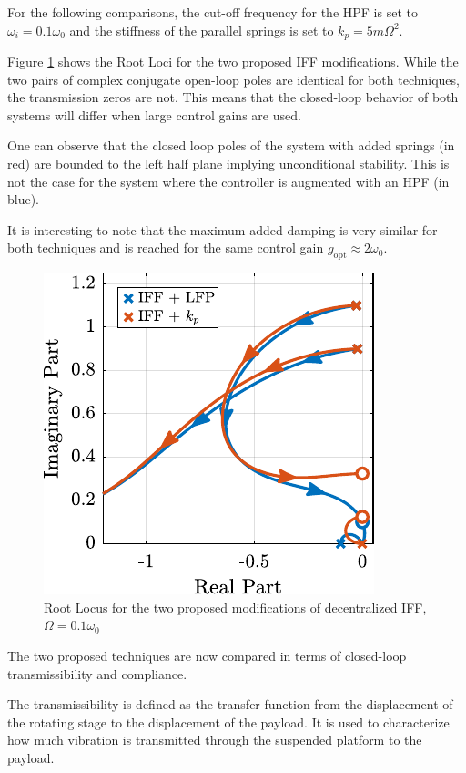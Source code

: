 \documentclass[10pt]{iopart}
\begin{document}
For the following comparisons, the cut-off frequency for the HPF is set to \(\omega_i = 0.1 \omega_0\) and the stiffness of the parallel springs is set to \(k_p = 5 m \Omega^2\).

\par
Figure \ref{fig:comp_root_locus} shows the Root Loci for the two proposed IFF modifications.
While the two pairs of complex conjugate open-loop poles are identical for both techniques, the transmission zeros are not.
This means that the closed-loop behavior of both systems will differ when large control gains are used.

One can observe that the closed loop poles of the system with added springs (in red) are bounded to the left half plane implying unconditional stability.
This is not the case for the system where the controller is augmented with an HPF (in blue).

It is interesting to note that the maximum added damping is very similar for both techniques and is reached for the same control gain \(g_\text{opt} \approx 2 \omega_0\).

\begin{figure}[htbp]
\centering
\includegraphics[scale=1]{figs/comp_root_locus.pdf}
\caption{\label{fig:comp_root_locus}Root Locus for the two proposed modifications of decentralized IFF, \(\Omega = 0.1 \omega_0\)}
\end{figure}

\par
The two proposed techniques are now compared in terms of closed-loop transmissibility and compliance.

The transmissibility is defined as the transfer function from the displacement of the rotating stage to the displacement of the payload.
It is used to characterize how much vibration is transmitted through the suspended platform to the payload.
\end{document}
